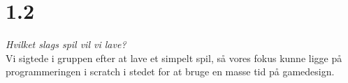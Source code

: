 \section{1.2}

\textit{Hvilket slags spil vil vi lave?}\\
Vi sigtede i gruppen efter at lave et simpelt spil,
så vores fokus kunne ligge på programmeringen i scratch
i stedet for at bruge en masse tid på gamedesign.\\

